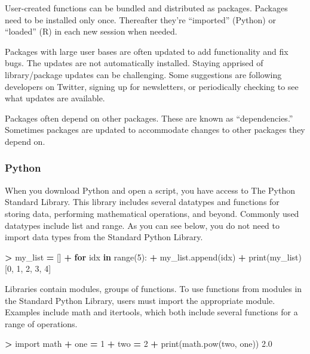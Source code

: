 \documentclass[
]{book}
\newenvironment{Shaded}{\begin{snugshade}}{\end{snugshade}}
\newcommand{\BuiltInTok}[1]{#1}
\newcommand{\ControlFlowTok}[1]{\textcolor[rgb]{0.13,0.29,0.53}{\textbf{#1}}}
\newcommand{\DecValTok}[1]{\textcolor[rgb]{0.00,0.00,0.81}{#1}}
\newcommand{\FloatTok}[1]{\textcolor[rgb]{0.00,0.00,0.81}{#1}}
\newcommand{\ImportTok}[1]{#1}
\newcommand{\KeywordTok}[1]{\textcolor[rgb]{0.13,0.29,0.53}{\textbf{#1}}}
\newcommand{\NormalTok}[1]{#1}
\newcommand{\OperatorTok}[1]{\textcolor[rgb]{0.81,0.36,0.00}{\textbf{#1}}}
\begin{document}
User-created functions can be bundled and distributed as packages. Packages need to be installed only once. Thereafter they're ``imported'' (Python) or ``loaded'' (R) in each new session when needed.

Packages with large user bases are often updated to add functionality and fix bugs. The updates are not automatically installed. Staying apprised of library/package updates can be challenging. Some suggestions are following developers on Twitter, signing up for newsletters, or periodically checking to see what updates are available.

Packages often depend on other packages. These are known as ``dependencies.'' Sometimes packages are updated to accommodate changes to other packages they depend on.

\hypertarget{python-3}{%
\subsubsection*{Python}\label{python-3}}

When you download Python and open a script, you have access to The Python Standard Library. This library includes several datatypes and functions for storing data, performing mathematical operations, and beyond. Commonly used datatypes include list and range. As you can see below, you do not need to import data types from the Standard Python Library.

\begin{Shaded}
\begin{Highlighting}[]
\OperatorTok{\textgreater{}}\NormalTok{ my\_list }\OperatorTok{=}\NormalTok{ []}
\OperatorTok{+} \ControlFlowTok{for}\NormalTok{ idx }\KeywordTok{in} \BuiltInTok{range}\NormalTok{(}\DecValTok{5}\NormalTok{):}
\OperatorTok{+}\NormalTok{   my\_list.append(idx)}
\OperatorTok{+} \BuiltInTok{print}\NormalTok{(my\_list)}
\NormalTok{[}\DecValTok{0}\NormalTok{, }\DecValTok{1}\NormalTok{, }\DecValTok{2}\NormalTok{, }\DecValTok{3}\NormalTok{, }\DecValTok{4}\NormalTok{]}
\end{Highlighting}
\end{Shaded}

Libraries contain modules, groups of functions. To use functions from modules in the Standard Python Library, users must import the appropriate module. Examples include math and itertools, which both include several functions for a range of operations.

\begin{Shaded}
\begin{Highlighting}[]
\OperatorTok{\textgreater{}} \ImportTok{import}\NormalTok{ math}
\OperatorTok{+}\NormalTok{ one }\OperatorTok{=} \DecValTok{1}
\OperatorTok{+}\NormalTok{ two }\OperatorTok{=} \DecValTok{2}
\OperatorTok{+} \BuiltInTok{print}\NormalTok{(math.}\BuiltInTok{pow}\NormalTok{(two, one))}
\FloatTok{2.0}
\end{Highlighting}
\end{Shaded}
\end{document}

